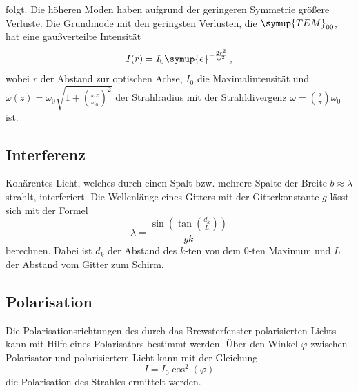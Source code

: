 folgt. Die höheren Moden haben aufgrund der geringeren Symmetrie größere Verluste.
Die Grundmode  mit den geringsten Verlusten, die $\symup{TEM}_{00}$, hat eine gaußverteilte Intensität
\begin{equation}
    I(r) = I_0 \symup{e}^{-\frac{2r^2}{\omega^2}} \, \text{,}
    \label{eqn:tem00}
\end{equation}
wobei $r$ der Abstand zur optischen Achse, $I_0$ die Maximalintensität
und $\omega(z) = \omega_0 \sqrt{1+(\frac{\omega z}{\omega_0})^2}$ der Strahlradius mit der Strahldivergenz $\omega = (\frac{\lambda}{\pi}) \omega_0$ ist.
\FloatBarrier

\subsection{Interferenz}
Kohärentes Licht, welches durch einen Spalt bzw. mehrere Spalte der Breite $b \approx \lambda$ strahlt, interferiert.
Die Wellenlänge eines Gitters mit der Gitterkonstante $g$ lässt sich mit der Formel
\begin{equation}
    \lambda = \frac{\sin(\tan(\frac{d_k}{L}))}{g k}
    \label{eqn:gitter}
\end{equation}
berechnen. Dabei ist $d_k$ der Abstand des $k$-ten von dem $0$-ten Maximum und $L$ der Abstand vom Gitter zum Schirm.

\subsection{Polarisation}
Die Polarisationsrichtungen des durch das Brewsterfenster polarisierten Lichts kann mit Hilfe eines Polarisators bestimmt werden.
Über den Winkel $\varphi$ zwischen Polarisator und polarisiertem Licht kann mit der Gleichung
\begin{equation}
    I = I_0 \cos^2(\varphi)
    \label{eqn:polar}
\end{equation}
die Polarisation des Strahles ermittelt werden.\cite{leifi}